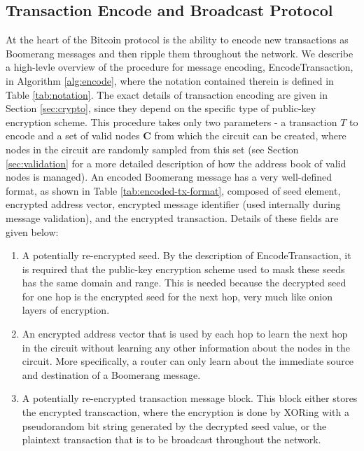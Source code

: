 \subsection{Transaction Encode and Broadcast Protocol} \label{sec:broadcast-protocol}

At the heart of the Bitcoin protocol is the ability to encode new transactions as Boomerang messages and then ripple them throughout the network. We describe a high-levle overview of the procedure for message encoding, {\sf EncodeTransaction}, in Algorithm \ref{alg:encode}, where the notation contained therein is defined in Table \ref{tab:notation}. The exact details of transaction encoding are given in Section \ref{sec:crypto}, since they depend on the specific type of public-key encryption scheme. This procedure takes only two parameters - a transaction $T$ to encode and a set of valid nodes $\mathbf{C}$ from which the circuit can be created, where nodes in the circuit are randomly sampled from this set (see Section \ref{sec:validation} for a more detailed description of how the address book of valid nodes is managed). An encoded Boomerang message has a very well-defined format, as shown in Table \ref{tab:encoded-tx-format}, composed of seed element, encrypted address vector, encrypted message identifier (used internally during message validation), and the encrypted transaction. Details of these fields are given below:
\begin{enumerate}
	\item A potentially re-encrypted seed. By the description of {\sf EncodeTransaction}, it is required that the public-key encryption scheme used to mask these seeds has the same domain and range. This is needed because the decrypted seed for one hop is the encrypted seed for the next hop, very much like onion layers of encryption.
	\item An encrypted address vector that is used by each hop to learn the next hop in the circuit without learning any other information about the nodes in the circuit. More specifically, a router can only learn about the immediate source and destination of a Boomerang message.
	\item A potentially re-encrypted transaction message block. This block either stores the encrypted transcaction, where the encryption is done by XORing with a pseudorandom bit string generated by the decrypted seed value, or the plaintext transaction that is to be broadcast throughout the network.
\end{enumerate}

